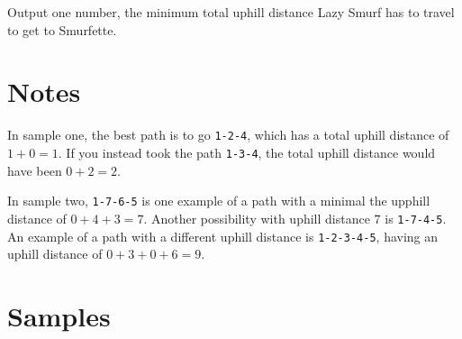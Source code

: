 Output one number, the minimum total uphill distance Lazy Smurf has to
travel to get to Smurfette.

\section*{Notes}

In sample one, the best path is to go \texttt{1-2-4}, which has a total uphill distance of $1+0=1$.
If you instead took the path \texttt{1-3-4}, the total uphill distance would have been $0+2=2$.

In sample two, \texttt{1-7-6-5} is one example of a path with a minimal the upphill distance of $0+4+3=7$.
Another possibility with uphill distance $7$ is \texttt{1-7-4-5}. An example of a path with a different uphill distance is
\texttt{1-2-3-4-5}, having an uphill distance of $0+3+0+6 = 9$.

\section*{Samples}
